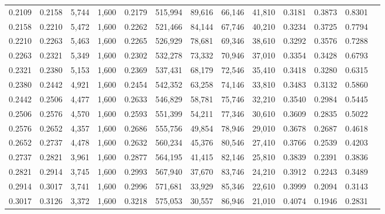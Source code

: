 \begin{tabular}{rrrrrrrrrrrrr}
0.2109 & 0.2158 &  5,744 & 1,600 &                                     0.2179 & 515,994 &  89,616 &  66,146 &  41,810 & 0.3181 & 0.3873 & 0.8301 \\
0.2158 & 0.2210 &  5,472 & 1,600 &                                     0.2262 & 521,466 &  84,144 &  67,746 &  40,210 & 0.3234 & 0.3725 & 0.7794 \\
0.2210 & 0.2263 &  5,463 & 1,600 &                                     0.2265 & 526,929 &  78,681 &  69,346 &  38,610 & 0.3292 & 0.3576 & 0.7288 \\
0.2263 & 0.2321 &  5,349 & 1,600 &                                     0.2302 & 532,278 &  73,332 &  70,946 &  37,010 & 0.3354 & 0.3428 & 0.6793 \\
0.2321 & 0.2380 &  5,153 & 1,600 &                                     0.2369 & 537,431 &  68,179 &  72,546 &  35,410 & 0.3418 & 0.3280 & 0.6315 \\
0.2380 & 0.2442 &  4,921 & 1,600 &                                     0.2454 & 542,352 &  63,258 &  74,146 &  33,810 & 0.3483 & 0.3132 & 0.5860 \\
0.2442 & 0.2506 &  4,477 & 1,600 &                                     0.2633 & 546,829 &  58,781 &  75,746 &  32,210 & 0.3540 & 0.2984 & 0.5445 \\
0.2506 & 0.2576 &  4,570 & 1,600 &                                     0.2593 & 551,399 &  54,211 &  77,346 &  30,610 & 0.3609 & 0.2835 & 0.5022 \\
0.2576 & 0.2652 &  4,357 & 1,600 &                                     0.2686 & 555,756 &  49,854 &  78,946 &  29,010 & 0.3678 & 0.2687 & 0.4618 \\
0.2652 & 0.2737 &  4,478 & 1,600 &                                     0.2632 & 560,234 &  45,376 &  80,546 &  27,410 & 0.3766 & 0.2539 & 0.4203 \\
0.2737 & 0.2821 &  3,961 & 1,600 &                                     0.2877 & 564,195 &  41,415 &  82,146 &  25,810 & 0.3839 & 0.2391 & 0.3836 \\
0.2821 & 0.2914 &  3,745 & 1,600 &                                     0.2993 & 567,940 &  37,670 &  83,746 &  24,210 & 0.3912 & 0.2243 & 0.3489 \\
0.2914 & 0.3017 &  3,741 & 1,600 &                                     0.2996 & 571,681 &  33,929 &  85,346 &  22,610 & 0.3999 & 0.2094 & 0.3143 \\
0.3017 & 0.3126 &  3,372 & 1,600 &                                     0.3218 & 575,053 &  30,557 &  86,946 &  21,010 & 0.4074 & 0.1946 & 0.2831 \\

\end{tabular}
